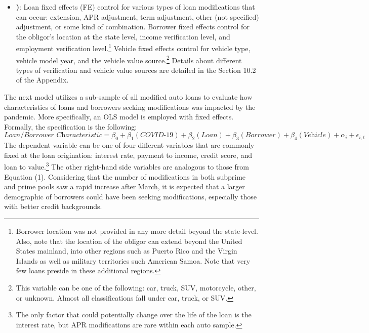 \documentclass[10.5pt]{article}
\begin{document}
\begin{itemize}[label=$-$, leftmargin=*]
    \item \textbf{)}: Loan fixed effects (FE) control for various types of loan modifications that can occur: extension, APR adjustment, term adjustment, other (not specified) adjustment, or some kind of combination. Borrower fixed effects control for the obligor's location at the state level, income verification level, and employment verification level.\footnote{Borrower location was not provided in any more detail beyond the state-level. Also, note that the location of the obligor can extend beyond the United States mainland, into other regions such as Puerto Rico and the Virgin Islands as well as military territories such American Samoa. Note that very few loans preside in these additional regions.} Vehicle fixed effects control for vehicle type, vehicle model year, and the vehicle value source.\footnote{This variable can be one of the following: car, truck, SUV, motorcycle, other, or unknown. Almost all classifications fall under car, truck, or SUV.} Details about different types of verification and vehicle value sources are detailed in the Section 10.2 of the Appendix.
\end{itemize}

The next model utilizes a sub-sample of all modified auto loans to evaluate how characteristics of loans and borrowers seeking modifications was impacted by the pandemic. More specifically, an OLS model is employed with fixed effects. Formally, the specification is the following: 
\begin{equation}
    \textit{Loan/Borrower Characteristic} = \beta_0 +
    \beta_1(\textit{COVID-19}) +
    \beta_2(\textit{Loan}) + \beta_3(\textit{Borrower}) + 
    \beta_4(\textit{Vehicle}) + \alpha_i + \epsilon_{i,t}
\end{equation}
The dependent variable can be one of four different variables that are commonly fixed at the loan origination: interest rate, payment to income, credit score, and loan to value.\footnote{The only factor that could potentially change over the life of the loan is the interest rate, but APR modifications are rare within each auto sample.} The other right-hand side variables are analogous to those from Equation (1). Considering that the number of modifications in both subprime and prime pools saw a rapid increase after March, it is expected that a larger demographic of borrowers could have been seeking modifications, especially those with better credit backgrounds.  
\end{document}

